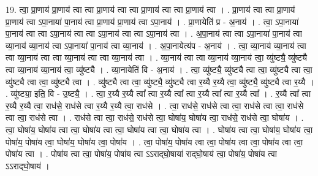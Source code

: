 \documentclass[17pt]{extarticle}
\begin{document}
19. त्वा॒ प्रा॒णाय॑ प्रा॒णाय॑ त्वा त्वा प्रा॒णाय॑ त्वा त्वा प्रा॒णाय॑ त्वा त्वा प्रा॒णाय॑ त्वा । . प्रा॒णाय॑ त्वा त्वा प्रा॒णाय॑ प्रा॒णाय॑ त्वा ऽपा॒नाया॑ पा॒नाय॑ त्वा प्रा॒णाय॑ प्रा॒णाय॑ त्वा ऽपा॒नाय॑ । . प्रा॒णायेति॑ प्र - अ॒नाय॑ । . त्वा॒ ऽपा॒नाया॑ पा॒नाय॑ त्वा त्वा ऽपा॒नाय॑ त्वा त्वा ऽपा॒नाय॑ त्वा त्वा ऽपा॒नाय॑ त्वा । . अ॒पा॒नाय॑ त्वा त्वा ऽपा॒नाया॑ पा॒नाय॑ त्वा व्या॒नाय॑ व्या॒नाय॑ त्वा ऽपा॒नाया॑ पा॒नाय॑ त्वा व्या॒नाय॑ । . अ॒पा॒नायेत्य॑प - अ॒नाय॑ । . त्वा॒ व्या॒नाय॑ व्या॒नाय॑ त्वा त्वा व्या॒नाय॑ त्वा त्वा व्या॒नाय॑ त्वा त्वा व्या॒नाय॑ त्वा । . व्या॒नाय॑ त्वा त्वा व्या॒नाय॑ व्या॒नाय॑ त्वा॒ व्यु॑ष्ट्यै॒ व्यु॑ष्ट्यै त्वा व्या॒नाय॑ व्या॒नाय॑ त्वा॒ व्यु॑ष्ट्यै । . व्या॒नायेति॑ वि - अ॒नाय॑ । . त्वा॒ व्यु॑ष्ट्यै॒ व्यु॑ष्ट्यै त्वा त्वा॒ व्यु॑ष्ट्यै त्वा त्वा॒ व्यु॑ष्ट्यै त्वा त्वा॒ व्यु॑ष्ट्यै त्वा । . व्यु॑ष्ट्यै त्वा त्वा॒ व्यु॑ष्ट्यै॒ व्यु॑ष्ट्यै त्वा र॒य्यै र॒य्यै त्वा॒ व्यु॑ष्ट्यै॒ व्यु॑ष्ट्यै त्वा र॒य्यै । . व्यु॑ष्ट्या॒ इति॒ वि - उ॒ष्ट्यै॒ । . त्वा॒ र॒य्यै र॒य्यै त्वा᳚ त्वा र॒य्यै त्वा᳚ त्वा र॒य्यै त्वा᳚ त्वा र॒य्यै त्वा᳚ । . र॒य्यै त्वा᳚ त्वा र॒य्यै र॒य्यै त्वा॒ राध॑से॒ राध॑से त्वा र॒य्यै र॒य्यै त्वा॒ राध॑से । . त्वा॒ राध॑से॒ राध॑से त्वा त्वा॒ राध॑से त्वा त्वा॒ राध॑से त्वा त्वा॒ राध॑से त्वा । . राध॑से त्वा त्वा॒ राध॑से॒ राध॑से त्वा॒ घोषा॑य॒ घोषा॑य त्वा॒ राध॑से॒ राध॑से त्वा॒ घोषा॑य । . त्वा॒ घोषा॑य॒ घोषा॑य त्वा त्वा॒ घोषा॑य त्वा त्वा॒ घोषा॑य त्वा त्वा॒ घोषा॑य त्वा । . घोषा॑य त्वा त्वा॒ घोषा॑य॒ घोषा॑य त्वा॒ पोषा॑य॒ पोषा॑य त्वा॒ घोषा॑य॒ घोषा॑य त्वा॒ पोषा॑य । . त्वा॒ पोषा॑य॒ पोषा॑य त्वा त्वा॒ पोषा॑य त्वा त्वा॒ पोषा॑य त्वा त्वा॒ पोषा॑य त्वा । . पोषा॑य त्वा त्वा॒ पोषा॑य॒ पोषा॑य त्वा ऽऽराद्‍घो॒षाया॑ राद्‍घो॒षाय॑ त्वा॒ पोषा॑य॒ पोषा॑य त्वा ऽऽराद्‍घो॒षाय॑ । \newline
\end{document}
